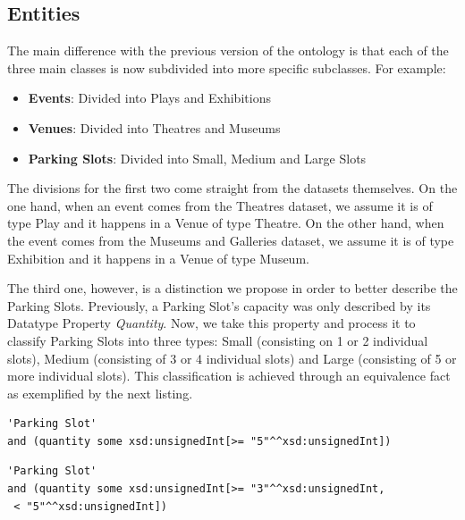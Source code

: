 \documentclass[runningheads,a4paper]{../../StyleFiles/llncs}
\begin{document}
\subsection{Entities}
The main difference with the previous version of the ontology is that each of the three main classes is now subdivided into more specific subclasses. For example:
\begin{itemize}
	\item \textbf{Events}: Divided into Plays and Exhibitions
	\item \textbf{Venues}: Divided into Theatres and Museums
	\item \textbf{Parking Slots}: Divided into Small, Medium and Large Slots
\end{itemize}

The divisions for the first two come straight from the datasets themselves. On the one hand, when an event comes from the Theatres dataset, we assume it is of type Play and it happens in a Venue of type Theatre. On the other hand, when the event comes from the Museums and Galleries dataset, we assume it is of type Exhibition and it happens in a Venue of type Museum.

The third one, however, is a distinction we propose in order to better describe the Parking Slots. Previously, a Parking Slot's capacity was only described by its Datatype Property \textit{Quantity}. Now, we take this property and process it to classify Parking Slots into three types: Small (consisting on 1 or 2 individual slots), Medium (consisting of 3 or 4 individual slots) and Large (consisting of 5 or more individual slots). This classification is achieved through an equivalence fact as exemplified by the next listing. \\

\begin{lstlisting}[captionpos=b, caption=Definition of Large Slot a subclass of Parking Slot, label=lst:owl, basicstyle=\ttfamily\small,frame=bt,showstringspaces=false]
'Parking Slot' 
and (quantity some xsd:unsignedInt[>= "5"^^xsd:unsignedInt])
\end{lstlisting}

\begin{lstlisting}[captionpos=b, caption=Definition of Medium Slot a subclass of Parking Slot, label=lst:owl, basicstyle=\ttfamily\small,frame=bt,showstringspaces=false]
'Parking Slot' 
and (quantity some xsd:unsignedInt[>= "3"^^xsd:unsignedInt,
 < "5"^^xsd:unsignedInt])
\end{lstlisting}
\end{document}
